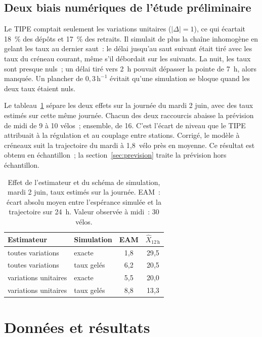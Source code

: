 \documentclass[10pt,a4paper,twocolumn]{article}
\theoremstyle{enonce}
\theoremstyle{defi}
\newcommand{\hr}{\,\mathrm{h}^{-1}}
\begin{document}
\subsection{Deux biais numériques de l'étude préliminaire}\label{sec:biais}

Le TIPE comptait seulement les variations unitaires ($|\Delta|=1$), ce qui écartait 18~\% des dépôts et 17~\% des retraits. Il simulait de plus la chaîne inhomogène en gelant les taux au dernier saut~: le délai jusqu'au saut suivant était tiré avec les taux du créneau courant, même s'il débordait sur les suivants. La nuit, les taux sont presque nuls~; un délai tiré vers 2~h pouvait dépasser la pointe de 7~h, alors manquée. Un plancher de $0{,}3\hr$ évitait qu'une simulation se bloque quand les deux taux étaient nuls.

Le tableau~\ref{tab:variantes} sépare les deux effets sur la journée du mardi 2 juin, avec des taux estimés sur cette même journée. Chacun des deux raccourcis abaisse la prévision de midi de 9 à 10 vélos~; ensemble, de 16. C'est l'\og écart de niveau\fg{} que le TIPE attribuait à la régulation et au couplage entre stations. Corrigé, le modèle à créneaux suit la trajectoire du mardi à 1{,}8~vélo près en moyenne. Ce résultat est obtenu en échantillon~; la section~\ref{sec:prevision} traite la prévision hors échantillon.

\begin{table}[t]
\centering\small
\caption{Effet de l'estimateur et du schéma de simulation, mardi 2 juin, taux estimés sur la journée. EAM~: écart absolu moyen entre l'espérance simulée et la trajectoire sur 24~h. Valeur observée à midi~: 30 vélos.}\label{tab:variantes}
\begin{tabular}{@{}llcc@{}}
\toprule
Estimateur & Simulation & EAM & $\hat X_{12\,\mathrm{h}}$\\
\midrule
toutes variations & exacte & 1{,}8 & 29{,}5\\
toutes variations & taux gelés & 6{,}2 & 20{,}5\\
variations unitaires & exacte & 5{,}5 & 20{,}0\\
variations unitaires & taux gelés & 8{,}8 & 13{,}3\\
\bottomrule
\end{tabular}
\end{table}

\section{Données et résultats}\label{sec:resultats}
\end{document}
